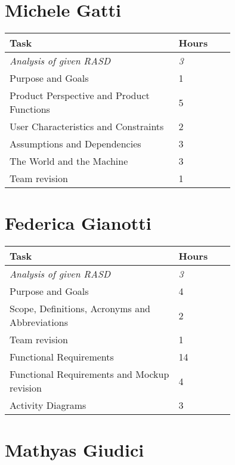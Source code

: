 \section{Michele Gatti}

\smallskip
\begin{center}
\begin{tabular}{ | p{0.75\linewidth} | l | }
  \hline
    \textbf{Task} & \textbf{Hours }\\ \hline
    \textit{Analysis of given RASD} & \textit{3} \\ \hline
    Purpose and Goals & 1 \\ \hline
    Product Perspective and Product Functions & 5 \\ \hline
    User Characteristics and Constraints & 2 \\ \hline
    Assumptions and Dependencies & 3 \\ \hline
    The World and the Machine & 3 \\ \hline
    Team revision & 1 \\ \hline
\end{tabular}
\end{center}
\smallskip


\section{Federica Gianotti}

\smallskip
\begin{center}
\begin{tabular}{ | p{0.75\linewidth} | l | }
  \hline
    \textbf{Task} & \textbf{Hours }\\ \hline
    \textit{Analysis of given RASD} & \textit{3} \\ \hline
    Purpose and Goals & 4 \\ \hline
    Scope, Definitions, Acronyms and Abbreviations & 2 \\ \hline
    Team revision & 1 \\ \hline
    Functional Requirements & 14 \\ \hline
    Functional Requirements and Mockup revision & 4 \\ \hline
    Activity Diagrams & 3 \\ \hline
\end{tabular}
\end{center}
\smallskip

\section{Mathyas Giudici}


